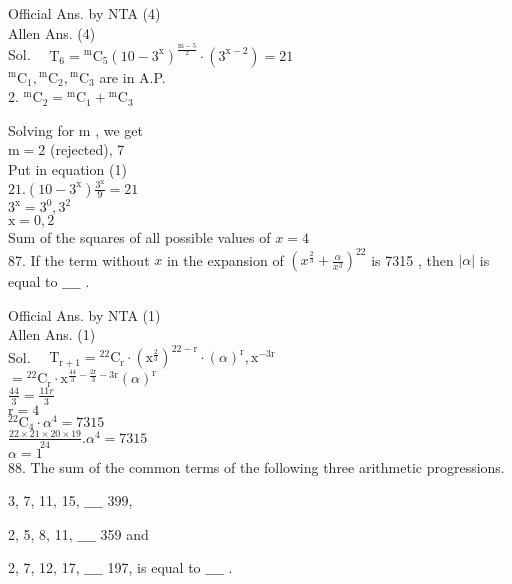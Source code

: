 \documentclass[10pt]{article}
\begin{document}
Official Ans. by NTA (4)\\
Allen Ans. (4)\\
Sol. \(\quad \mathrm{T}_{6}={ }^{\mathrm{m}} \mathrm{C}_{5}\left(10-3^{\mathrm{x}}\right)^{\frac{\mathrm{m}-5}{2}} \cdot\left(3^{\mathrm{x}-2}\right)=21\)\\
\({ }^{\mathrm{m}} \mathrm{C}_{1},{ }^{\mathrm{m}} \mathrm{C}_{2},{ }^{\mathrm{m}} \mathrm{C}_{3}\) are in A.P.\\
2. \({ }^{\mathrm{m}} \mathrm{C}_{2}={ }^{\mathrm{m}} \mathrm{C}_{1}+{ }^{\mathrm{m}} \mathrm{C}_{3}\)

Solving for m , we get\\
\(\mathrm{m}=2\) (rejected), 7\\
Put in equation (1)\\
\(21 .\left(10-3^{\mathrm{x}}\right) \frac{3^{\mathrm{x}}}{9}=21\)\\
\(3^{\mathrm{x}}=3^{0}, 3^{2}\)\\
\(\mathrm{x}=0,2\)\\
Sum of the squares of all possible values of \(x=4\)\\
87. If the term without \(x\) in the expansion of \(\left(x^{\frac{2}{3}}+\frac{\alpha}{x^{3}}\right)^{22}\) is 7315 , then \(|\alpha|\) is equal to \(\_\_\_\_\) .

Official Ans. by NTA (1)\\
Allen Ans. (1)\\
Sol. \(\quad \mathrm{T}_{\mathrm{r}+1}={ }^{22} \mathrm{C}_{\mathrm{r}} \cdot\left(\mathrm{x}^{\frac{2}{3}}\right)^{22-\mathrm{r}} \cdot(\alpha)^{\mathrm{r}}, \mathrm{x}^{-3 \mathrm{r}}\)\\
\(={ }^{22} \mathrm{C}_{\mathrm{r}} \cdot \mathrm{x}^{\frac{44}{3}-\frac{2 \mathrm{r}}{3}-3 \mathrm{r}}(\alpha)^{\mathrm{r}}\)\\
\(\frac{44}{3}=\frac{11 r}{3}\)\\
\(\mathrm{r}=4\)\\
\({ }^{22} \mathrm{C}_{4} \cdot \alpha^{4}=7315\)\\
\(\frac{22 \times 21 \times 20 \times 19}{24} . \alpha^{4}=7315\)\\
\(\alpha=1\)\\
88. The sum of the common terms of the following three arithmetic progressions.

3, 7, 11, 15, \(\_\_\_\_\) 399,

2, 5, 8, 11, \(\_\_\_\_\) 359 and

2, 7, 12, 17, \(\_\_\_\_\) 197, is equal to \(\_\_\_\_\) .
\end{document}
